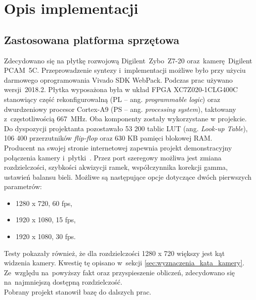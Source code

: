 \chapter{Opis implementacji}
\label{cha:Opis implementacji}
\section{Zastosowana platforma sprzętowa}
\label{sec:Zastosowana platforma sprzętowa}
Zdecydowano się na płytkę rozwojową Digilent~Zybo~Z7-20 oraz~kamerę~Digilent PCAM~5C. Przeprowadzenie syntezy i~implementacji możliwe było przy użyciu darmowego oprogramowania Vivado SDK WebPack. Podczas prac używano wersji~2018.2. Płytka wyposażona była w układ FPGA XC7Z020-1CLG400C stanowiący część rekonfigurowalną (PL -- ang. \textit{programmable logic}) oraz dwurdzeniowy procesor Cortex-A9 (PS -- ang. \textit{processing system}), taktowany z~częstotliwością 667~MHz. Oba komponenty zostały wykorzystane w projekcie. Do dyspozycji projektanta pozostawało 53 200 tablic LUT (ang. \textit{Look-up Table}), 106 400 przerzutników \textit{flip-flop} oraz 630 KB pamięci blokowej RAM. \\
Producent na swojej stronie internetowej zapewnia projekt demonstracyjny połączenia kamery i~płytki~\cite{projektPCAM}. Przez port szeregowy możliwa jest zmiana rozdzielczości, szybkości akwizycji ramek, współczynnika korekcji gamma, ustawień balansu bieli. Możliwe są następujące opcje dotyczące dwóch pierwszych parametrów:
\begin{itemize}
	\item 1280 x 720, 60 fps,
	\item 1920 x 1080, 15 fps,
	\item 1920 x 1080, 30 fps.
\end{itemize}
Testy pokazały również, że dla rozdzielczości 1280 x 720 większy jest kąt widzenia kamery. Kwestię tę opisano w~sekcji \ref{sec:wyznaczenia_kata_kamery}. Ze~względu na~powyższy fakt oraz przyspieszenie obliczeń, zdecydowano się na~najmniejszą dostępną rozdzielczość.\\
Pobrany projekt stanowił bazę do dalszych prac. 
